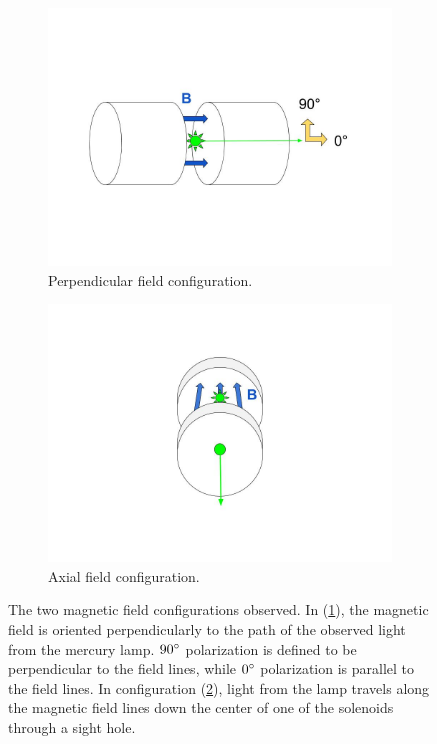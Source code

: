 \documentclass[twocolumn]{article}
\begin{document}
	\begin{figure}
		\centering
		\begin{subfigure}{0.5\textwidth}
			\includegraphics[width = 1.0\textwidth]{Images/FieldConfigA.jpg}
			\caption{Perpendicular field configuration.}
			\label{subfig:PerpFieldConfig}
		\end{subfigure}%
		\begin{subfigure}{0.5\textwidth}
			\centering
			\includegraphics[width=1.0\textwidth]{Images/FieldConfigB.jpg}
			\caption{Axial field configuration.}
			\label{subfig:AxialFieldConfig}
		\end{subfigure}%
		\caption{The two magnetic field configurations observed. In (\ref{subfig:PerpFieldConfig}), the magnetic field is oriented perpendicularly to the path of the observed light from the mercury lamp. $90\degree$ polarization is defined to be perpendicular to the field lines, while $0\degree$ polarization is parallel to the field lines. In configuration (\ref{subfig:AxialFieldConfig}), light from the lamp travels along the magnetic field lines down the center of one of the solenoids through a sight hole.}
		\label{fig:FieldConfig}
	\end{figure}
	
\end{document}
